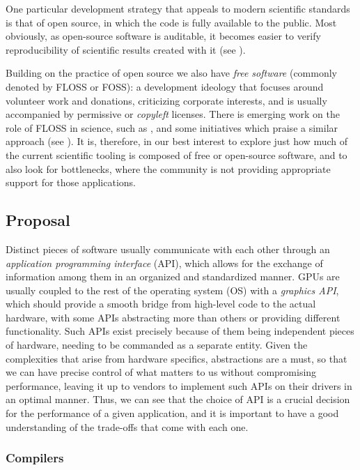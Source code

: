 \documentclass[11pt, conference, onecolumn, final]{IEEEtran}
\begin{document}
One particular development strategy that appeals to modern scientific standards
is that of open source, in which the code is fully available to the public.
Most obviously, as open-source software is auditable, it becomes easier to
verify reproducibility of scientific results created with it (see
\cite{barba2022defining}).

Building on the practice of open source we also have \textit{free software}
(commonly denoted by FLOSS or FOSS): a development ideology that focuses around
volunteer work and donations, criticizing corporate interests, and is usually
accompanied by permissive or \textit{copyleft} licenses.
There is emerging work on the role of FLOSS in science, such as
\cite{fortunato2021case}, and some initiatives which praise a similar approach
(see \cite{katz2018community, barker2022introducing}).
It is, therefore, in our best interest to explore just how much of the current
scientific tooling is composed of free or open-source software, and to also
look for bottlenecks, where the community is not providing appropriate support
for those applications.

\subsection{Proposal} \label{sec:intro:proposal}

Distinct pieces of software usually communicate with each other through an
\textit{application programming interface} (API), which allows for the exchange
of information among them in an organized and standardized manner.
GPUs are usually coupled to the rest of the operating system (OS) with a
\textit{graphics API}, which should provide a smooth bridge from high-level
code to the actual hardware, with some APIs abstracting more than others or
providing different functionality.
Such APIs exist precisely because of them being independent pieces of hardware,
needing to be commanded as a separate entity.
Given the complexities that arise from hardware specifics, abstractions are a
must, so that we can have precise control of what matters to us without
compromising performance, leaving it up to vendors to implement such APIs on
their drivers in an optimal manner.
Thus, we can see that the choice of API is a crucial decision for the
performance of a given application, and it is important to have a good
understanding of the trade-offs that come with each one.

\subsubsection{Compilers} \label{sec:proposal:compilers}
\end{document}
